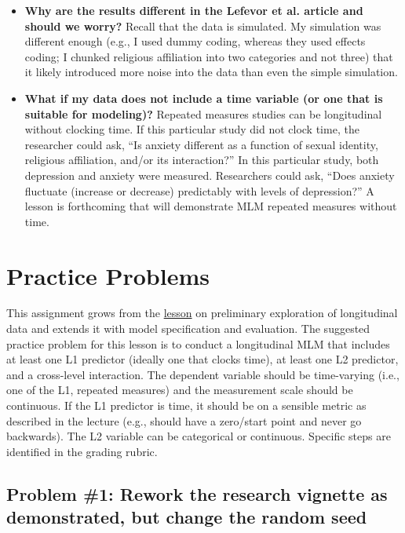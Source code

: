 \documentclass[
  english,
]{book}
\begin{document}
\begin{itemize}
\item
  \textbf{Why are the results different in the Lefevor et al. \citeyearpar{lefevor_religious_2017} article and should we worry?} Recall that the data is simulated. My simulation was different enough (e.g., I used dummy coding, whereas they used effects coding; I chunked religious affiliation into two categories and not three) that it likely introduced more noise into the data than even the simple simulation.
\item
  \textbf{What if my data does not include a time variable (or one that is suitable for modeling)?} Repeated measures studies can be longitudinal without clocking time. If this particular study did not clock time, the researcher could ask, ``Is anxiety different as a function of sexual identity, religious affiliation, and/or its interaction?'' In this particular study, both depression and anxiety were measured. Researchers could ask, ``Does anxiety fluctuate (increase or decrease) predictably with levels of depression?'' A lesson is forthcoming that will demonstrate MLM repeated measures without time.
\end{itemize}

\hypertarget{practice-problems-2}{%
\section{Practice Problems}\label{practice-problems-2}}

This assignment grows from the \protect\hyperlink{MLMexplore}{lesson} on preliminary exploration of longitudinal data and extends it with model specification and evaluation. The suggested practice problem for this lesson is to conduct a longitudinal MLM that includes at least one L1 predictor (ideally one that clocks time), at least one L2 predictor, and a cross-level interaction. The dependent variable should be time-varying (i.e., one of the L1, repeated measures) and the measurement scale should be continuous. If the L1 predictor is time, it should be on a sensible metric as described in the lecture (e.g., should have a zero/start point and never go backwards). The L2 variable can be categorical or continuous. Specific steps are identified in the grading rubric.

\hypertarget{problem-1-rework-the-research-vignette-as-demonstrated-but-change-the-random-seed-2}{%
\subsection{Problem \#1: Rework the research vignette as demonstrated, but change the random seed}\label{problem-1-rework-the-research-vignette-as-demonstrated-but-change-the-random-seed-2}}
\end{document}
